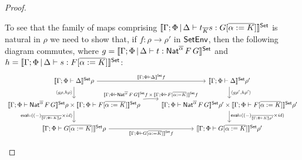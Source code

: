 \documentclass[acmsmall,review,anonymous]{acmart}
\theoremstyle{definition}
\renewcommand{\id}{\mathit{id}}
\begin{document}
\begin{proof}
\begin{itemize}
\vspace*{0.1in}

To see that the family of maps comprising $\llbracket{\Gamma;\Phi \,|\,
  \Delta \vdash t_{\overline K} s: G [\overline{\alpha := K}]}\rrbracket^{\mathsf{Set}}$
is natural in $\rho$
we need to show that, if $f : \rho \to \rho'$ in $\mathsf{SetEnv}$, then the
following diagram commutes, where $g = \llbracket{\Gamma;\Phi \,|\,
  \Delta \vdash t : \mathsf{Nat}^{\overline{\alpha}} \,F \,G}\rrbracket^{\mathsf{Set}}$ and $h =
\llbracket{\Gamma;\Phi \,|\, \Delta \vdash s: F [\overline{\alpha :=
      K}]}\rrbracket^{\mathsf{Set}}$:
{\footnotesize
\[\begin{tikzcd}
\setsem{\Gamma;\Phi \vdash \Delta}\rho \ar[r, "{\setsem{\Gamma;\Phi
      \vdash \Delta}f}"] \ar[d, "{\langle g \rho, h \rho\rangle}"']
& \setsem{\Gamma;\Phi \vdash 
  \Delta}\rho' \ar[d, "{\langle g \rho', h \rho' \rangle}"]\\
\setsem{\Gamma;\Phi \vdash \Nat^{\overline{\alpha}} \,F \,G}\rho
\times \setsem{\Gamma;\Phi \vdash F [\overline{\alpha := K}]}\rho
\ar[d, "{\eval \circ ((-)_{\overline{\sem{\Gamma;\Phi\vdash K}\rho}} \times
    \id)}"']
\ar[r, bend left = 5, "{\setsem{\Gamma;\Phi \vdash
      \Nat^{\overline{\alpha}} \,F \,G}f\, \times\, \setsem{\Gamma;\Phi
      \vdash F [\overline{\alpha := K}]}f}"] &
\setsem{\Gamma;\Phi \vdash \Nat^{\overline{\alpha}} \,F \,G}\rho'
\times \setsem{\Gamma;\Phi \vdash F [\overline{\alpha := K}]}\rho'
\ar[d, "{\eval \circ ((-)_{\overline{\sem{\Gamma;\Phi\vdash
          K}\rho'}} \times \id)}"] \\
\setsem{\Gamma;\Phi \vdash G [\overline{\alpha := K}]}\rho
\ar[r, "{\setsem{\Gamma;\Phi \vdash G [\overline{\alpha := K}]}f}"']
&
\setsem{\Gamma;\Phi \vdash G [\overline{\alpha := K}]}\rho'
\end{tikzcd}\]}


\end{itemize}
\end{proof}
\end{document}
